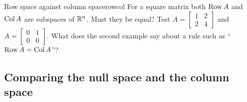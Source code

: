 \documentclass[11pt]{article}
\begin{document}
\begin{think}{Row space against column space}{rowcol}
For a square matrix both $\operatorname{Row} A$ and $\operatorname{Col} A$ are subspaces of $\mathbb{R}^n$. Must they be equal? Test $A=\begin{bmatrix}1&2\\2&4\end{bmatrix}$ and $A=\begin{bmatrix}0&1\\0&0\end{bmatrix}$. What does the second example say about a rule such as ``$\operatorname{Row} A=\operatorname{Col} A$''?
\end{think}

\subsection*{Comparing the null space and the column space}
\end{document}
